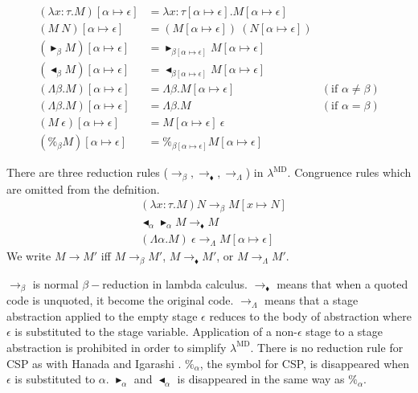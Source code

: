 \documentclass[runningheads]{llncs}
\newcommand{\LMD}{$\lambda^{\textrm{MD}}$}
\newcommand{\TB}{\blacktriangleright}
\newcommand{\TBL}{\blacktriangleleft}
\begin{document}
\begin{align*}
    (\lambda x:\tau.M)[\alpha \mapsto \epsilon] &= \lambda x:\tau[\alpha \mapsto \epsilon].M[\alpha \mapsto \epsilon] \\
    (M\ N)[\alpha \mapsto \epsilon] &= (M[\alpha \mapsto \epsilon])\ (N[\alpha \mapsto \epsilon]) \\
    (\TB_\beta M)[\alpha \mapsto \epsilon] &= \TB_{\beta[\alpha \mapsto \epsilon]} M[\alpha \mapsto \epsilon] \\
    (\TBL_\beta M)[\alpha \mapsto \epsilon] &= \TBL_{\beta[\alpha \mapsto \epsilon]} M[\alpha \mapsto \epsilon] \\
    (\Lambda\beta.M)[\alpha \mapsto \epsilon] &= \Lambda\beta.M[\alpha \mapsto \epsilon] & (\text{if } \alpha \neq \beta) \\
    (\Lambda\beta.M)[\alpha \mapsto \epsilon] &= \Lambda\beta.M & (\text{if } \alpha = \beta) \\
    (M\ \epsilon)[\alpha \mapsto \epsilon] &= M[\alpha \mapsto \epsilon]\ \epsilon \\
    (\%_\beta M)[\alpha \mapsto \epsilon] &= \%_{\beta[\alpha \mapsto \epsilon]}M[\alpha \mapsto \epsilon] 
\end{align*}

\begin{definition}[Reduction]
There are three reduction rules ($\longrightarrow_\beta, \longrightarrow_\blacklozenge, \longrightarrow_\Lambda$) in \LMD.
Congruence rules which are omitted from the defnition.
\begin{align*}
    & (\lambda x:\tau.M) N \longrightarrow_\beta M[x \mapsto N] \\
    & \TBL_\alpha \TB_\alpha M \longrightarrow_\blacklozenge M \\
    & (\Lambda \alpha.M)\ \epsilon \longrightarrow_\Lambda M[\alpha \mapsto \epsilon]
\end{align*}
We write $ M \longrightarrow M'$ iff $ M \longrightarrow_\beta M'$, $ M \longrightarrow_\blacklozenge M'$, or $ M \longrightarrow_\Lambda M'$.
\end{definition}

$\longrightarrow_\beta$ is normal $\beta-$reduction in lambda calculus.
$\longrightarrow_\blacklozenge$ means that when a quoted code is unquoted, it become the original code.
$\longrightarrow_\Lambda$ means that a stage abstraction applied to the empty stage $\epsilon$ reduces to the body of abstraction
where $\epsilon$ is substituted to the stage variable.
Application of a non-$\epsilon$ stage to a stage abstraction is prohibited in order to simplify \LMD.
There is no reduction rule for CSP as with Hanada and Igarashi \cite{Hanada2014}.
$\%_\alpha$, the symbol for CSP, is disappeared when $\epsilon$ is substituted to $\alpha$.
$\TB_\alpha$ and $\TBL_\alpha$ is disappeared in the same way as $\%_\alpha$.
\end{document}
